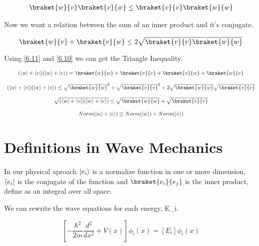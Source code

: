 \begin{equation}
  \label{6.10}
  \begin{array}{c}
    \braket{w}{v}\braket{v}{w} \leq \braket{v}{v} \braket{w}{w}
  \end{array}
\end{equation}

Now we want a relation between the sum of an inner product and it's conjugate.

\begin{equation}
  \label{6.11}
  \braket{w}{v}+\braket{v}{w} \leq 2 \sqrt{\braket{v}{v} \braket{w}{w}}
\end{equation}

Using \ref{6.11} and \ref{6.10} we can get the Triangle Inequality.

\begin{equation}
  \label{6.12}
  \begin{array}{c}
    (\bra{w}+\bra{v})(\ket{w}+\ket{v}) = \braket{w}{w}+\braket{v}{v}+\braket{v}{w}+\braket{w}{v}
    \\

    \\
    (\bra{w}+\bra{v})(\ket{w}+\ket{v}) \leq \sqrt{\braket{w}{w}}^2 + \sqrt{\braket{v}{v}}^2 + 2 \sqrt{\braket{w}{w}} \sqrt{\braket{v}{v}}
    \\

    \\
    \sqrt{(\bra{w}+\bra{v})(\ket{w}+\ket{v})} \leq \sqrt{\braket{w}{w}} + \sqrt{\braket{v}{v}}
    \\

    \\
    Norm(\ket{w}+\ket{v}) \leq Norm(\ket{w}) + Norm(\ket{v})
  \end{array}
\end{equation}

\section{Definitions in Wave Mechanics}

In our physical aproach $\lvert e_i\rangle$ is a normalize function in one or more dimension, $\langle e_i\rvert$ is the conjugate of the function and $\braket{e_i}{e_j}$ is the inner product, define as an integral over all space.

We can rewrite the wave equations for each energy, E_i.

\begin{equation}
\label{6.13}
\left[-\frac{\hbar^2}{2m} \frac{d^2}{dx^2}+ V(x) \right] \phi_i(x) = [E_i] \phi_i(x)
\end{equation}





